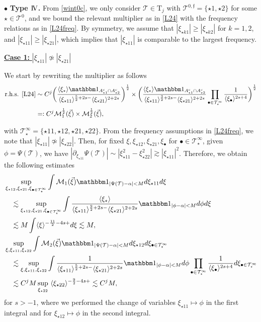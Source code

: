 \documentclass[a4paper,
11pt,  reqno]{amsart}
\newcommand{\IV}{\textup{I \hspace{-2.9mm} V}}
\newcommand{\5}{\textup{V}}
\newcommand{\noi}{\noindent}
\newcommand{\ind}{\mathbbm 1}
\newcommand{\les}{\lesssim}
\theoremstyle{remark}
\newcommand{\bul}{\bullet}
\newcommand{\TT}{\mathcal{T}}
\newcommand{\Tr}{\mathrm{T}}
\newcommand{\al}{\alpha}
\newcommand{\ges}{\gtrsim}
\newcommand{\jb}[1]
{\langle #1 \rangle}
\newcommand{\ff}{\mathfrak{f}}
\newcommand{\M}{\mathcal{M}}
\numberwithin{equation}{section}
\numberwithin{theorem}{section}
\begin{document}
\medskip

\noi
$\bul$ \textbf{Type $\IV$.}
From \eqref{wint0c},
we only consider $\TT\in\Tr_j$
 with $\TT^{0,\ff} = \{\star1,\star2\}$ for some $\star \in \TT^0$, and we bound the relevant multiplier as in \eqref{L24} with the frequency relations as in \eqref{L24freq}.
By symmetry, we assume that $|\xi_{\star k1 }| \ge |\xi_{\star k 2} | $ for $k=1,2$, and $|\xi_{\star11}| \ge |\xi_{\star21}|$, which implies that $|\xi_{\star11}|$ is comparable to the largest frequency.


\smallskip
\noi
\underline{\textbf{Case 1:} $|\xi_{\star11}| \not\simeq |\xi_{\star21}|$}



We start by rewriting the multiplier as follows
\begin{align}
\text{r.h.s. \eqref{L24}}
&
\sim C^j   \bigg( \frac{\jb{\xi_\star}
\ind_{ A^c_{\star1} \cap A^c_{\star2}}
}{\jb{\xi_{\star11}}^{\frac52+2s-} \jb{\xi_{\star21}}^{2+2s}}  \bigg)^\frac12
\times
\bigg(
\frac{
\jb{\xi_\star}
\ind_{ A^c_{\star1} \cap A^c_{\star2}}
}{
\jb{\xi_{\star11}}^{\frac32+2s-}
\jb{\xi_{\star21}}^{2+2s}
}
\prod_{\bul\in \TT^\infty_\star} \frac{1}{\jb{\xi_\bul}^{2s+4}}
\bigg)^\frac12
\\
&
=: C^j \M_1^\frac12(\vec\xi) \times \M_2^\frac12 (\vec\xi)
,
\end{align}

\noi
with $\TT^\infty_\star =\{\star11, \star12, \star21, \star22\}$.
From the frequency assumptions in \eqref{L24freq}, we note that $|\xi_{\star11}| \not\simeq |\xi_{\star22}|$.
Then, for fixed $\xi, \xi_{\star12}, \xi_{\star21}, \xi_\bul$ for $\bul\in \TT^\infty_\star$, given $\phi = \Psi(\TT)$, we have $|\partial_{\xi_{\star11}} \Psi(\TT) | \sim  |\xi_{\star11}^2 - \xi_{\star22}^2| \ges |\xi_{\star11}|^2$. Therefore, we obtain the following estimates
\begin{align}
&
\sup_{\xi_{\star12}, \xi_{\star21}, \xi_{\bul\in \TT^\infty_\star}}
\int \M_1 (\vec\xi) \ind_{|\Psi(\TT) - \al| < M } d\xi_{\star11} d\xi
\\
&
\quad
\les
\sup_{\xi_{\star12}, \xi_{\star21}, \xi_{\bul\in \TT^\infty_\star}}
\int
\frac{\jb{\xi_\star} }{ \jb{\xi_{\star11}}^{\frac92 + 2s-} \jb{\xi_{\star21}}^{2+2s} } \ind_{|\phi - \al| < M } d\phi d\xi
\\
&
\quad
\les M \int \jb{\xi}^{-\frac{11}{2} - 4s + } d\xi \les M,
\\
&
\sup_{\xi, \xi_{\star11}, \xi_{\star22}}
\int \M_2(\vec\xi)  \ind_{|\Psi(\TT) - \al| < M}
d \xi_{\star12}
d\xi_{\bul \in \TT^\infty_\star}
\\
&
\quad
\les
\sup_{\xi, \xi_{\star11}, \xi_{\star22}}
\int
\frac{ 1  }{ \jb{\xi_{\star11}}^{\frac52 + 2s -} \jb{\xi_{\star21}}^{2+2s} } \ind_{|\phi - \al| < M} d\phi
\prod_{\bul\in \TT^\infty_\star} \frac{1}{\jb{\xi_\bul}^{2s+4}}
d\xi_{\bul \in \TT^\infty_\star}
\\
&
\quad
\les
 C^{j} M  \sup_{\xi_{\star22}}\ \jb{\xi_{\star22}}^{- \frac92 - 4s + } \les C^{j} M
,
\end{align}
for $s>-1$,
where we performed the change of variables $\xi_{\star11} \mapsto \phi$ in the first integral
and for $\xi_{\star12} \mapsto \phi$ in the second integral.
\end{document}
